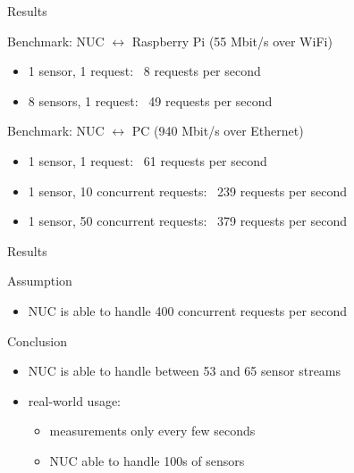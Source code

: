 \begin{frame}{Results}
  \begin{block}{Benchmark: NUC $\leftrightarrow$ Raspberry Pi (55 Mbit/s over WiFi)}
    \begin{itemize}
      \item 1 sensor, 1 request: ~8 requests per second
      \item 8 sensors, 1 request: ~49 requests per second
    \end{itemize}
  \end{block}

  \begin{block}{Benchmark: NUC $\leftrightarrow$ PC (940 Mbit/s over Ethernet)}
    \begin{itemize}
      \item 1 sensor, 1 request: ~61 requests per second
      \item 1 sensor, 10 concurrent requests: ~239 requests per second
      \item 1 sensor, 50 concurrent requests: ~379 requests per second
    \end{itemize}
  \end{block}
\end{frame}

\begin{frame}{Results}
  \begin{block}{Assumption}
    \begin{itemize}
      \item NUC is able to handle 400 concurrent requests per second
    \end{itemize}
  \end{block}

  \begin{block}{Conclusion}
    \begin{itemize}
      \item NUC is able to handle between 53 and 65 sensor streams
      \item real-world usage:
        \begin{itemize}
          \item measurements only every few seconds
          \item NUC able to handle 100s of sensors
        \end{itemize}
    \end{itemize}
  \end{block}
\end{frame}
